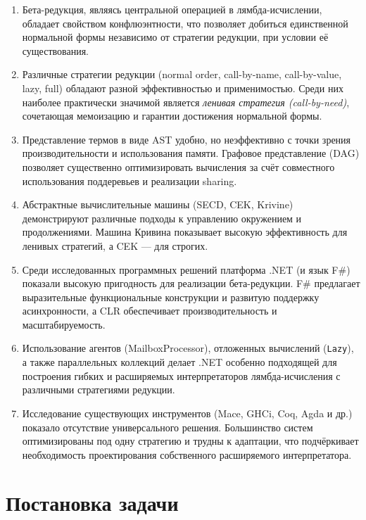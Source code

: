 \begin{enumerate}
  \item Бета-редукция, являясь центральной операцией в лямбда-исчислении, обладает свойством конфлюэнтности, что позволяет добиться единственной нормальной формы независимо от стратегии редукции, при условии её существования.
  
  \item Различные стратегии редукции (normal order, call-by-name, call-by-value, lazy, full) обладают разной эффективностью и применимостью. Среди них наиболее практически значимой является \emph{ленивая стратегия (call-by-need)}, сочетающая мемоизацию и гарантии достижения нормальной формы.
  
  \item Представление термов в виде AST удобно, но неэффективно с точки зрения производительности и использования памяти. Графовое представление (DAG) позволяет существенно оптимизировать вычисления за счёт совместного использования поддеревьев и реализации sharing.
  
  \item Абстрактные вычислительные машины (SECD, CEK, Krivine) демонстрируют различные подходы к управлению окружением и продолжениями. Машина Кривина показывает высокую эффективность для ленивых стратегий, а CEK — для строгих.
  
  \item Среди исследованных программных решений платформа .NET (и язык F\#) показали высокую пригодность для реализации бета-редукции. F\# предлагает выразительные функциональные конструкции и развитую поддержку асинхронности, а CLR обеспечивает производительность и масштабируемость.
  
  \item Использование агентов (MailboxProcessor), отложенных вычислений (\texttt{Lazy}), а также параллельных коллекций делает .NET особенно подходящей для построения гибких и расширяемых интерпретаторов лямбда-исчисления с различными стратегиями редукции.
  
  \item Исследование существующих инструментов (Mace, GHCi, Coq, Agda и др.) показало отсутствие универсального решения. Большинство систем оптимизированы под одну стратегию и трудны к адаптации, что подчёркивает необходимость проектирования собственного расширяемого интерпретатора.
\end{enumerate}


\section{Постановка задачи}

